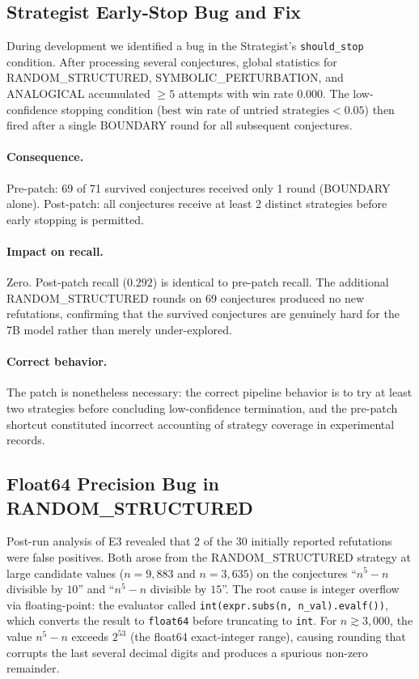 \subsection{Strategist Early-Stop Bug and Fix}
\label{sec:strategist_fix}

During development we identified a bug in the Strategist's
\texttt{should\_stop} condition.
After processing several conjectures, global statistics for
RANDOM\_STRUCTURED, SYMBOLIC\_PERTURBATION, and ANALOGICAL accumulated
$\geq 5$ attempts with win rate $0.000$.
The low-confidence stopping condition
($\text{best win rate of untried strategies} < 0.05$)
then fired after a single BOUNDARY round for all subsequent conjectures.

\paragraph{Consequence.} Pre-patch: 69 of 71 survived conjectures received
only 1 round (BOUNDARY alone). Post-patch: all conjectures receive at least
2 distinct strategies before early stopping is permitted.

\paragraph{Impact on recall.} Zero.
Post-patch recall ($0.292$) is identical to pre-patch recall.
The additional RANDOM\_STRUCTURED rounds on 69 conjectures produced no new
refutations, confirming that the survived conjectures are genuinely hard for
the 7B model rather than merely under-explored.

\paragraph{Correct behavior.} The patch is nonetheless necessary: the correct
pipeline behavior is to try at least two strategies before concluding
low-confidence termination, and the pre-patch shortcut constituted incorrect
accounting of strategy coverage in experimental records.

\subsection{Float64 Precision Bug in RANDOM\_STRUCTURED}
\label{sec:evalf_bug}

Post-run analysis of E3 revealed that 2 of the 30 initially reported refutations
were false positives.
Both arose from the RANDOM\_STRUCTURED strategy at large candidate values
($n = 9{,}883$ and $n = 3{,}635$) on the conjectures
``$n^5 - n$ divisible by $10$'' and ``$n^5 - n$ divisible by $15$''.
The root cause is integer overflow via floating-point: the evaluator called
\texttt{int(expr.subs(n, n\_val).evalf())}, which converts the result to
\texttt{float64} before truncating to \texttt{int}.
For $n \gtrsim 3{,}000$, the value $n^5 - n$ exceeds $2^{53}$
(the float64 exact-integer range), causing rounding that corrupts the
last several decimal digits and produces a spurious non-zero remainder.

